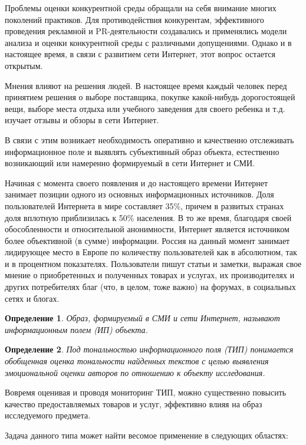 \documentclass[a4paper,14pt,russian]{extreport}
\newtheorem{Def}{Определение} %
\begin{document}
Проблемы оценки конкурентной среды обращали на себя внимание многих поколений практиков. Для противодействия конкурентам, эффективного проведения рекламной и PR-деятельности создавались и применялись модели анализа и оценки конкурентной среды с различными допущениями. Однако и в настоящее время, в связи с развитием сети Интернет, этот вопрос остается открытым.

Мнения влияют на решения людей. В настоящее время каждый человек перед принятием решения о выборе поставщика, покупке какой-нибудь дорогостоящей вещи, выборе места отдыха или учебного заведения для своего ребенка и т.д. изучает отзывы и обзоры в сети Интернет.

В связи с этим возникает необходимость оперативно и качественно отслеживать информационное поле и выявлять субъективный образ объекта, естественно возникающий или намеренно формируемый в сети Интернет и СМИ.

Начиная с момента своего появления и до настоящего времени Интернет занимает позиции одного из основных информационных источников. Доля пользователей Интернета в мире составляет 35\%, причем в развитых странах доля вплотную приблизилась к 50\% населения.  В то же время, благодаря своей обособленности и относительной анонимности, Интернет является источником более объективной (в сумме) информации. Россия на данный момент занимает лидирующее место в Европе по количеству пользователей как в абсолютном, так и в процентном показателях. Пользователи пишут статьи и заметки, выражая свое мнение о приобретенных и полученных товарах и услугах, их производителях и других потребителях благ (что, в целом, тоже важно) на форумах, в социальных сетях и блогах.
\begin{Def}
Образ, формируемый в СМИ и сети Интернет, называют информационным полем \mbox{(ИП)} объекта.
\end{Def}

\begin{Def}
Под тональностью информационного поля \mbox{(ТИП)} понимается обобщенная оценка тональности найденных текстов с целью выявления эмоциональной оценки авторов по отношению к объекту исследования.
\end{Def}

Вовремя оценивая и проводя мониторинг \mbox{ТИП}, можно существенно повысить качество предоставляемых товаров и услуг, эффективно влияя на образ исследуемого предмета.

Задача данного типа может найти весомое применение в следующих областях:
\end{document}
